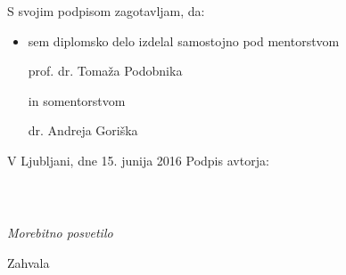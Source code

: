 \vspace{1.5cm}
S svojim podpisom zagotavljam, da:
\begin{itemize}
	\item sem diplomsko delo izdelal samostojno pod mentorstvom 
	
	prof. dr. Tomaža Podobnika
	
	in somentorstvom 
	
	dr. Andreja Goriška
	
\end{itemize}

\vspace{1cm}
V Ljubljani, dne 15. junija 2016 \hspace{2cm} Podpis avtorja:
\newpage

\ \thispagestyle{empty}
\newpage

\thispagestyle{empty}

$\;$ 

\vspace{5cm}
\hfill {\Large \em Morebitno posvetilo}
\thispagestyle{empty}

\vfill
Zahvala
\newpage

\newpage

\renewcommand\thepage{} 
\tableofcontents 
\renewcommand\thepage{\arabic{page}}
\thispagestyle{empty}


\newpage

\setcounter{page}{1}


\ \thispagestyle{empty}
\newpage
